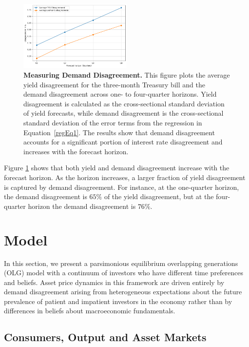 \documentclass[preprint,11pt,authoryear]{elsarticle}
\theoremstyle{plain}
\begin{document}
\begin{figure}[htbp]
\centering
\vspace{0.1in}
\includegraphics[width=0.5\textwidth]{figures/DemandDisagreementFigIntro.png}  
\caption{\textbf{Measuring Demand Disagreement.} This figure plots the average yield disagreement for the three-month Treasury bill and the demand disagreement across one- to four-quarter horizons. Yield disagreement is calculated as the cross-sectional standard deviation of yield forecasts, while demand disagreement is the cross-sectional standard deviation of the error terms from the regression in Equation~\eqref{regEq1}. The results show that demand disagreement accounts for a significant portion of interest rate disagreement and increases with the forecast horizon.}  \label{fig:DemandDisagreementMotivating}
\end{figure}
%
Figure \ref{fig:DemandDisagreementMotivating} shows that both yield and demand disagreement increase with the forecast horizon. As the horizon increases, a larger fraction of yield disagreement is captured by demand disagreement. For instance, at the one-quarter horizon, the demand disagreement is $65\%$ of the yield disagreement, but at the four-quarter horizon the demand disagreement is $76\%$. 


\section{Model}\label{sec:Model}


In this section, we present a parsimonious equilibrium overlapping generations (OLG) model with a continuum of investors who have different time preferences and beliefs. Asset price dynamics in this framework are driven entirely by demand disagreement arising from heterogeneous expectations about the future prevalence of patient and impatient investors in the economy rather than by differences in beliefs about macroeconomic fundamentals.

\subsection{Consumers, Output and Asset Markets}\label{sec:consumers}
\end{document}
